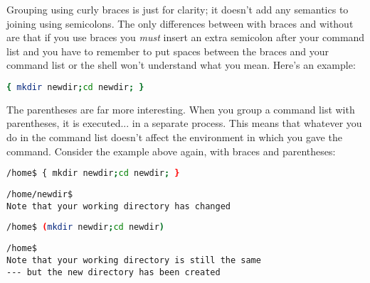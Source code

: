 Grouping using curly braces is just for clarity; it doesn't add any semantics
to joining using semicolons. The only differences between with braces and
without are that if you use braces you \emph{must} insert an extra semicolon
after your command list and you have to remember to put spaces between the
braces and your command list or the shell won't understand what you mean.
Here's an example:
\lstset{basicstyle=\scriptsize, numbers=left, captionpos=b, tabsize=4}
\begin{lstlisting}[caption=Create a directory and change into it all in one go grouped with curly braces,language={bash},
breaklines=true,xleftmargin=15pt,label=lst:Create a directory and change into it all in one go grouped with curly braces]
{ mkdir newdir;cd newdir; }
\end{lstlisting}

The parentheses are far more interesting. When you group a command list with
parentheses, it is executed... in a separate process. This means that whatever
you do in the command list doesn't affect the environment in which you gave the
command. Consider the example above again, with braces and parentheses:
\lstset{basicstyle=\scriptsize, numbers=left, captionpos=b, tabsize=4}
\begin{lstlisting}[caption=Create a directory and change into it all in one go grouped with curly braces,language={bash},
breaklines=true,xleftmargin=15pt,label=lst:Create a directory and change into it all in one go grouped with curly braces]
/home$ { mkdir newdir;cd newdir; }
\end{lstlisting}

\scriptsize
\begin{verbatim}
/home/newdir$
Note that your working directory has changed
\end{verbatim}
\normalsize

\lstset{basicstyle=\scriptsize, numbers=left, captionpos=b, tabsize=4}
\begin{lstlisting}[caption=Create a directory and change into it all in one go grouped with parentheses,language={bash},
breaklines=true,xleftmargin=15pt,label=lst:Create a directory and change into it all in one go grouped with parentheses]
/home$ (mkdir newdir;cd newdir)
\end{lstlisting}

\scriptsize
\begin{verbatim}
/home$
Note that your working directory is still the same 
--- but the new directory has been created
\end{verbatim}
\normalsize

